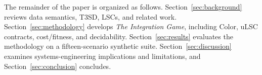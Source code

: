 The remainder of the paper is organized as follows. Section~\ref{sec:background} reviews data semantics, T3SD, LSCs, and related work.  Section~\ref{sec:methodology} develops \emph{The Integration Game}, including Color, uLSC contracts, cost/fitness, and decidability.  Section~\ref{sec:results} evaluates the methodology on a fifteen-scenario synthetic suite. Section~\ref{sec:discussion} examines systems-engineering implications and limitations, and Section~\ref{sec:conclusion} concludes.
